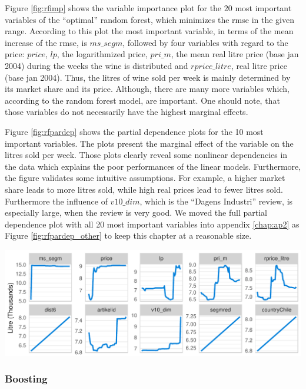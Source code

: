 \documentclass[11pt,]{article}
\let\origfigure\figure
\let\endorigfigure\endfigure
\renewenvironment{figure}[1][2] {
    \expandafter\origfigure\expandafter[H]
} {
    \endorigfigure
}
\begin{document}
Figure \ref{fig:rfimp} shows the variable importance plot for the \(20\)
most important variables of the \enquote{optimal} random forest, which
minimizes the \ac{rmse} in the given range. According to this plot the
most important variable, in terms of the mean increase of the \ac{rmse},
is \(ms\_segm\), followed by four variables with regard to the price:
\(price\), \(lp\), the logarithmized price, \(pri\_m\), the mean real
litre price (base jan 2004) during the weeks the wine is distributed and
\(rprice\_litre\), real litre price (base jan 2004). Thus, the litres of
wine sold per week is mainly determined by its market share and its
price. Although, there are many more variables which, according to the
random forest model, are important. One should note, that those
variables do not necessarily have the highest marginal effects.

Figure \ref{fig:rfpardep} shows the partial dependence plots for the 10
most important variables. The plots present the marginal effect of the
variable on the litres sold per week. Those plots clearly reveal some
nonlinear dependencies in the data which explains the poor performances
of the linear models. Furthermore, the figure validates some intuitive
assumptions. For example, a higher market share leads to more litres
sold, while high real prices lead to fewer litres sold. Furthermore the
influence of \(v10\_dim\), which is the \enquote{Dagens Industri}
review, is especially large, when the review is very good. We moved the
full partial dependence plot with all 20 most important variables into
appendix \ref{chap:ap2} as Figure \ref{fig:rfpardep_other} to keep this
chapter at a reasonable size.

\begin{figure}
\centering
\includegraphics{../00_data/output_paper/11_par_dep_random_forest.pdf}
\caption{\label{fig:rfpardep}Random Forest: Partial Dependence Plots.}
\end{figure}

\hypertarget{boosting}{%
\subsubsection{Boosting}\label{boosting}}
\end{document}
